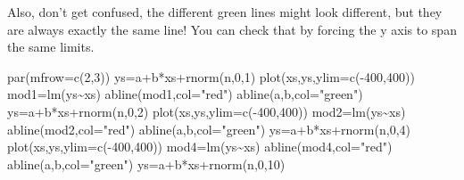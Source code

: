 \documentclass[
]{book}
\newenvironment{Shaded}{\begin{snugshade}}{\end{snugshade}}
\newcommand{\AttributeTok}[1]{\textcolor[rgb]{0.77,0.63,0.00}{#1}}
\newcommand{\DecValTok}[1]{\textcolor[rgb]{0.00,0.00,0.81}{#1}}
\newcommand{\FunctionTok}[1]{\textcolor[rgb]{0.00,0.00,0.00}{#1}}
\newcommand{\NormalTok}[1]{#1}
\newcommand{\OtherTok}[1]{\textcolor[rgb]{0.56,0.35,0.01}{#1}}
\newcommand{\SpecialCharTok}[1]{\textcolor[rgb]{0.00,0.00,0.00}{#1}}
\newcommand{\StringTok}[1]{\textcolor[rgb]{0.31,0.60,0.02}{#1}}
\begin{document}
Also, don't get confused, the different green lines might look different, but they are always exactly the same line! You can check that by forcing the y axis to span the same limits.

\begin{Shaded}
\begin{Highlighting}[]
\FunctionTok{par}\NormalTok{(}\AttributeTok{mfrow=}\FunctionTok{c}\NormalTok{(}\DecValTok{2}\NormalTok{,}\DecValTok{3}\NormalTok{))}
\NormalTok{ys}\OtherTok{=}\NormalTok{a}\SpecialCharTok{+}\NormalTok{b}\SpecialCharTok{*}\NormalTok{xs}\SpecialCharTok{+}\FunctionTok{rnorm}\NormalTok{(n,}\DecValTok{0}\NormalTok{,}\DecValTok{1}\NormalTok{)}
\FunctionTok{plot}\NormalTok{(xs,ys,}\AttributeTok{ylim=}\FunctionTok{c}\NormalTok{(}\SpecialCharTok{{-}}\DecValTok{400}\NormalTok{,}\DecValTok{400}\NormalTok{))}
\NormalTok{mod1}\OtherTok{=}\FunctionTok{lm}\NormalTok{(ys}\SpecialCharTok{\textasciitilde{}}\NormalTok{xs)}
\FunctionTok{abline}\NormalTok{(mod1,}\AttributeTok{col=}\StringTok{"red"}\NormalTok{)}
\FunctionTok{abline}\NormalTok{(a,b,}\AttributeTok{col=}\StringTok{"green"}\NormalTok{)}
\NormalTok{ys}\OtherTok{=}\NormalTok{a}\SpecialCharTok{+}\NormalTok{b}\SpecialCharTok{*}\NormalTok{xs}\SpecialCharTok{+}\FunctionTok{rnorm}\NormalTok{(n,}\DecValTok{0}\NormalTok{,}\DecValTok{2}\NormalTok{)}
\FunctionTok{plot}\NormalTok{(xs,ys,}\AttributeTok{ylim=}\FunctionTok{c}\NormalTok{(}\SpecialCharTok{{-}}\DecValTok{400}\NormalTok{,}\DecValTok{400}\NormalTok{))}
\NormalTok{mod2}\OtherTok{=}\FunctionTok{lm}\NormalTok{(ys}\SpecialCharTok{\textasciitilde{}}\NormalTok{xs)}
\FunctionTok{abline}\NormalTok{(mod2,}\AttributeTok{col=}\StringTok{"red"}\NormalTok{)}
\FunctionTok{abline}\NormalTok{(a,b,}\AttributeTok{col=}\StringTok{"green"}\NormalTok{)}
\NormalTok{ys}\OtherTok{=}\NormalTok{a}\SpecialCharTok{+}\NormalTok{b}\SpecialCharTok{*}\NormalTok{xs}\SpecialCharTok{+}\FunctionTok{rnorm}\NormalTok{(n,}\DecValTok{0}\NormalTok{,}\DecValTok{4}\NormalTok{)}
\FunctionTok{plot}\NormalTok{(xs,ys,}\AttributeTok{ylim=}\FunctionTok{c}\NormalTok{(}\SpecialCharTok{{-}}\DecValTok{400}\NormalTok{,}\DecValTok{400}\NormalTok{))}
\NormalTok{mod4}\OtherTok{=}\FunctionTok{lm}\NormalTok{(ys}\SpecialCharTok{\textasciitilde{}}\NormalTok{xs)}
\FunctionTok{abline}\NormalTok{(mod4,}\AttributeTok{col=}\StringTok{"red"}\NormalTok{)}
\FunctionTok{abline}\NormalTok{(a,b,}\AttributeTok{col=}\StringTok{"green"}\NormalTok{)}
\NormalTok{ys}\OtherTok{=}\NormalTok{a}\SpecialCharTok{+}\NormalTok{b}\SpecialCharTok{*}\NormalTok{xs}\SpecialCharTok{+}\FunctionTok{rnorm}\NormalTok{(n,}\DecValTok{0}\NormalTok{,}\DecValTok{10}\NormalTok{)}

\end{Highlighting}
\end{Shaded}
\end{document}
